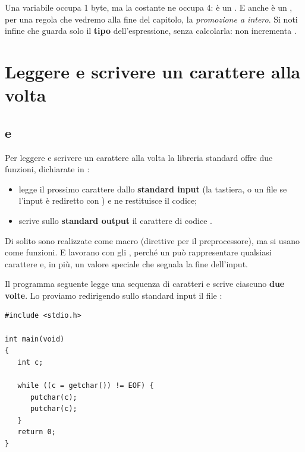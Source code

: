 Una variabile  occupa 1 byte, ma la costante  ne
occupa 4: è un . E anche  è un , per una
regola che vedremo alla fine del capitolo, la \textit{promozione a intero}.
Si noti infine che  guarda solo il \textbf{tipo}
dell'espressione, senza calcolarla:  non incrementa
.

\section{Leggere e scrivere un carattere alla volta}

\subsection{ e }

Per leggere e scrivere un carattere alla volta la libreria standard offre
due funzioni, dichiarate in :

\begin{itemize}
  \item {} legge il prossimo carattere dallo
        \textbf{standard input} (la tastiera, o un file se l'input è
        rediretto con \code{<}) e ne restituisce il codice;
  \item {} scrive sullo \textbf{standard output} il
        carattere di codice .
\end{itemize}

Di solito sono realizzate come macro (direttive per il preprocessore), ma si
usano come funzioni. E lavorano con gli , perché un  può
rappresentare qualsiasi carattere e, in più, un valore speciale che segnala
la fine dell'input.

Il programma seguente legge una sequenza di caratteri e scrive ciascuno
\textbf{due volte}. Lo proviamo redirigendo sullo standard input il file
:

\begin{affianco}[0.5][c]
\begin{lstlisting}[style=c, name=double_out.c]
#include <stdio.h>

int main(void)
{
   int c;

   while ((c = getchar()) != EOF) {
      putchar(c);
      putchar(c);
   }
   return 0;
}
\end{lstlisting}
\risultato
{}
\end{affianco}

